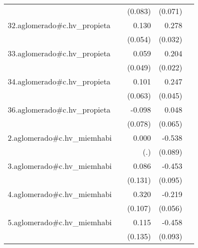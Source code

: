{\begin{longtable}{l*{4}{D{.}{.}{-1}}}
            &                     &     (0.083)         &     (0.071)         &                     \\
\addlinespace
32.aglomerado#c.hv\_propieta&                     &       0.130\sym{*}  &       0.278\sym{***}&                     \\
            &                     &     (0.054)         &     (0.032)         &                     \\
\addlinespace
33.aglomerado#c.hv\_propieta&                     &       0.059         &       0.204\sym{***}&                     \\
            &                     &     (0.049)         &     (0.022)         &                     \\
\addlinespace
34.aglomerado#c.hv\_propieta&                     &       0.101         &       0.247\sym{***}&                     \\
            &                     &     (0.063)         &     (0.045)         &                     \\
\addlinespace
36.aglomerado#c.hv\_propieta&                     &      -0.098         &       0.048         &                     \\
            &                     &     (0.078)         &     (0.065)         &                     \\
\addlinespace
2.aglomerado#c.hv\_miemhabi&                     &       0.000         &      -0.538\sym{***}&                     \\
            &                     &         (.)         &     (0.089)         &                     \\
\addlinespace
3.aglomerado#c.hv\_miemhabi&                     &       0.086         &      -0.453\sym{***}&                     \\
            &                     &     (0.131)         &     (0.095)         &                     \\
\addlinespace
4.aglomerado#c.hv\_miemhabi&                     &       0.320\sym{**} &      -0.219\sym{***}&                     \\
            &                     &     (0.107)         &     (0.056)         &                     \\
\addlinespace
5.aglomerado#c.hv\_miemhabi&                     &       0.115         &      -0.458\sym{***}&                     \\
            &                     &     (0.135)         &     (0.093)         &                     \\

\end{longtable}}
